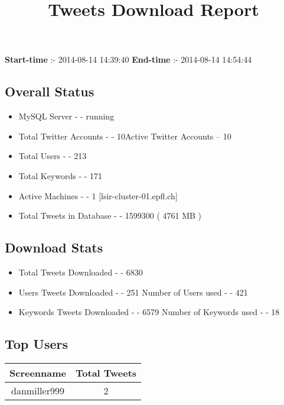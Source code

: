 \documentclass{article}\usepackage[T1]{fontenc}
\begin{document}
\title{\textbf{Tweets Download Report}}
               \date{}
                \maketitle
               \centerline{\textbf{Start-time} :- 2014-08-14 14:39:40 \hspace{40pt} \textbf{End-time} :- 2014-08-14 14:54:44}               \subsection*{Overall Status}                \begin{itemize}                \item MySQL Server - - running               \item Total Twitter Accounts - - 10\newline Active Twitter Accounts -- 10               \item Total Users - - 213               \item Total Keywords - - 171               \item Active Machines - - 1 [lsir-cluster-01.epfl.ch]               \item Total Tweets in Database - - 1599300 ( 4761 MB )               \end{itemize}               \subsection*{Download Stats}                \begin{itemize}                \item Total Tweets Downloaded - - 6830               \item Users Tweets Downloaded - - 251 \newline Number of Users used - - 421               \item Keywords Tweets Downloaded - - 6579 \newline Number of Keywords used - - 18              \end{itemize}              \subsection*{Top Users}\begin{tabular}{|c|c|}         \hline         Screenname & Total Tweets \\ 
 \hline
danmiller999 & 2\\ 
 \hline

\end{tabular}
\end{document}
